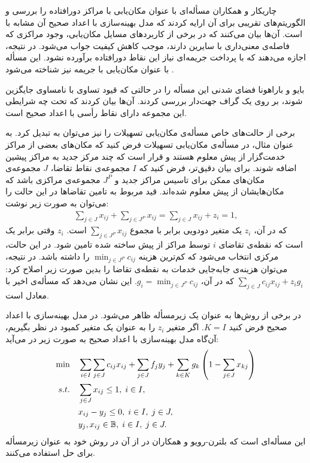 چاریکار و همکاران \cite{CKMN2001} مسأله‌ای با عنوان  مکان‌یابی با مراکز دورافتاده   را بررسی و الگوریتم‌های تقریبی برای آن ارایه کردند که مدل بهینه‌سازی با اعداد صحیح آن مشابه با  است. آن‌ها بیان می‌کنند که در برخی از کاربردهای مسایل مکان‌یابی، وجود   مراکزی که فاصله‌ی معنی‌داری با سایرین دارند، موجب کاهش کیفیت جواب می‌شود. در نتیجه،  اجازه می‌دهند که با پرداخت جریمه‌ای نیاز این نقاط دورافتاده برآورده نشود. این مسأله با عنوان مکان‌یابی با جریمه نیز شناخته می‌شود \cite{XX2005}.

 بایو و باراهونا   \cite{BB2009} فضای شدنی این مسأله را در حالتی که قیود تساوی  با نامساوی جایگزین شوند، بر روی یک گراف جهت‌دار بررسی کردند. آن‌ها بیان کردند که تحت چه شرایطی این مجموعه دارای نقاط رأسی با اعداد صحیح است.
 
 برخی از حالت‌های خاص مسأله‌ی مکان‌یابی تسهیلات را  نیز  می‌توان به  تبدیل کرد. به عنوان مثال، در مسأله‌ی مکان‌یابی تسهیلات فرض کنید که مکان‌های بعضی از مراکز خدمت‌گزار از پیش معلوم هستند و قرار است که چند مرکز جدید به مراکز پیشین اضافه شوند. برای بیان دقیق‌تر، فرض کنید که $I$ مجموعه‌ی نقاط تقاضا، $J$ مجموعه‌ی مکان‌های ممکن برای تاسیس مراکز جدید و $J^P$  مجموعه‌ی مراکزی باشد که مکان‌هایشان از پیش معلوم شده‌اند. قید مربوط به تامین تقاضاها در این حالت را می‌توان به صورت زیر نوشت:
 \begin{align*}
 \sum_{j\in J} x_{ij} +  \sum_{j\in J^P} x_{ij}= \sum_{j\in J} x_{ij} + z_i= 1,
 \end{align*}
که در آن، $z_i$ یک متغیر دودویی برابر با مجموع $\sum_{j\in J^P} x_{ij} $ است.   $z_i$ وقتی برابر یک است که نقطه‌ی تقاضای  $i$ توسط مراکز از پیش ساخته شده تامین شود. در این حالت، مرکزی انتخاب می‌شود که کم‌ترین هزینه  $\min_{j\in J^P} c_{ij}$ را داشته باشد. در نتیجه، می‌توان هزینه‌ی  جابه‌جایی خدمات به نقطه‌ی  تقاضا   را بدین صورت زیر اصلاح کرد: $\sum_{j\in J} c_{ij} x_{ij} + z_i g_i$  که در آن، $g_i = \min_{j\in J^P} c_{ij}$. این نشان می‌دهد که مسأله‌ی اخیر با  معادل است. 

 در برخی از روش‌ها به عنوان یک زیرمسأله ظاهر می‌شود. در  مدل بهینه‌سازی با اعداد صحیح   فرض کنید $K=I$.  اگر متغیر $z_i$ را به عنوان یک متغیر کمبود  در نظر بگیریم، آن‌گاه مدل بهینه‌سازی با اعداد صحیح به صورت زیر در می‌آید:
 \begin{align}
\min  \quad    & \sum_{i\in I}\sum_{j\in J} c_{ij}x_{ij} +  \sum_{j\in J} f_j y_j   + \sum_{k\in K} g_k\left(1-\sum_{j\in J}x_{kj} \right) \\
 s. t. \quad      & \sum_{j\in J} x_{ij} \leq 1 ,  \; i\in I, \\
                & x_{ij} - y_j \leq 0,  \; i\in I, \; j\in J, \\
                & y_j, x_{ij} \in \mathbb{B}, \; i\in I, \; j\in J.
 \end{align}
این مسأله‌ای است که بلترن-رویو و همکاران در \cite{BVA2012} از آن در روش خود به عنوان زیرمسأله برای حل  استفاده می‌کنند.
